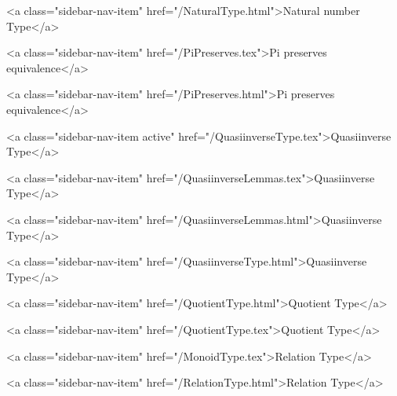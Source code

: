       
        
          <a class="sidebar-nav-item" href="/NaturalType.html">Natural number Type</a>
        
      
    
      
        
          <a class="sidebar-nav-item" href="/PiPreserves.tex">Pi preserves equivalence</a>
        
      
    
      
        
          <a class="sidebar-nav-item" href="/PiPreserves.html">Pi preserves equivalence</a>
        
      
    
      
        
          <a class="sidebar-nav-item active" href="/QuasiinverseType.tex">Quasiinverse Type</a>
        
      
    
      
        
          <a class="sidebar-nav-item" href="/QuasiinverseLemmas.tex">Quasiinverse Type</a>
        
      
    
      
        
          <a class="sidebar-nav-item" href="/QuasiinverseLemmas.html">Quasiinverse Type</a>
        
      
    
      
        
          <a class="sidebar-nav-item" href="/QuasiinverseType.html">Quasiinverse Type</a>
        
      
    
      
        
          <a class="sidebar-nav-item" href="/QuotientType.html">Quotient Type</a>
        
      
    
      
        
          <a class="sidebar-nav-item" href="/QuotientType.tex">Quotient Type</a>
        
      
    
      
        
          <a class="sidebar-nav-item" href="/MonoidType.tex">Relation Type</a>
        
      
    
      
        
          <a class="sidebar-nav-item" href="/RelationType.html">Relation Type</a>
        
